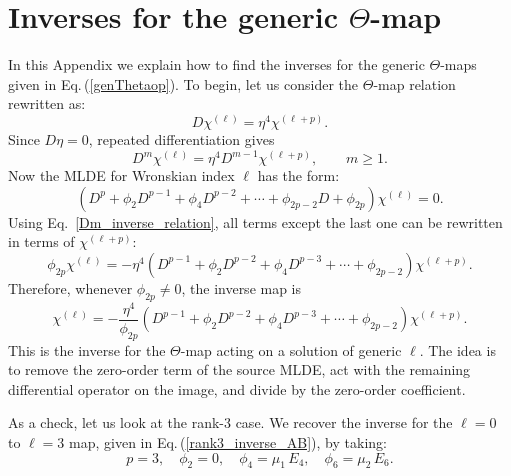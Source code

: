 \documentclass[11pt]{article}
\newcommand\be{\begin{equation}}
\newcommand\ee{\end{equation}}
\newcommand{\eref}[1]{Eq.\,(\ref{#1})}
\begin{document}
\section{Inverses for the generic $\Theta$-map}\label{sec:gen_inv}

In this Appendix we explain how to find the inverses for the generic $\Theta$-maps given in \eref{genThetaop}. To begin, let us consider the $\Theta$-map relation rewritten as:
\begin{equation}
    D\chi^{(\ell)}
    =
    \eta^4\chi^{(\ell+p)} .
    \label{forward_relation_for_inverse}
\end{equation}
Since \(D\eta=0\), repeated differentiation gives
\begin{equation}
    D^m\chi^{(\ell)}
    =
    \eta^4D^{m-1}\chi^{(\ell+p)},
    \qquad m\geq 1.
    \label{Dm_inverse_relation}
\end{equation}
Now the MLDE for Wronskian index $\ell$ has the form:
\begin{equation}
    \left(
        D^p
        + \phi_2D^{p-1}
        + \phi_4D^{p-2}
        +\cdots
        + \phi_{2p-2}D
        + \phi_{2p}
    \right)\chi^{(\ell)}=0.
    \label{general_source_mlde_for_inverse}
\end{equation}
Using Eq.~\eqref{Dm_inverse_relation}, all terms except the last one can be rewritten in terms of \(\chi^{(\ell+p)}\):
\begin{equation}
    \phi_{2p}\chi^{(\ell)}
    =
    -\eta^4
    \left(
        D^{p-1}
        + \phi_2D^{p-2}
        + \phi_4D^{p-3}
        +\cdots
        + \phi_{2p-2}
    \right)\chi^{(\ell+p)} .
\end{equation}
Therefore, whenever \(\phi_{2p}\neq 0\), the inverse map is
\begin{equation}
    \chi^{(\ell)}
    =
    -\frac{\eta^4}{\phi_{2p}}
    \left(
        D^{p-1}
        + \phi_2D^{p-2}
        + \phi_4D^{p-3}
        +\cdots
        + \phi_{2p-2}
    \right)\chi^{(\ell+p)} .
    \label{general_theta_inverse_rule}
\end{equation}
This is the inverse for the \(\Theta\)-map acting on a solution of generic $\ell$. The idea is to remove the zero-order term of the source MLDE, act with the remaining differential operator on the image, and divide by the zero-order coefficient.

As a check, let us look at the rank-3 case. We recover the inverse for the $\ell=0$ to $\ell=3$ map, given in \eref{rank3_inverse_AB}, by taking:
\be
p=3, \quad \phi_2 = 0, \quad \phi_4 = \mu_1\,E_4, \quad \phi_6 = \mu_2\,E_6.
\ee
\end{document}
